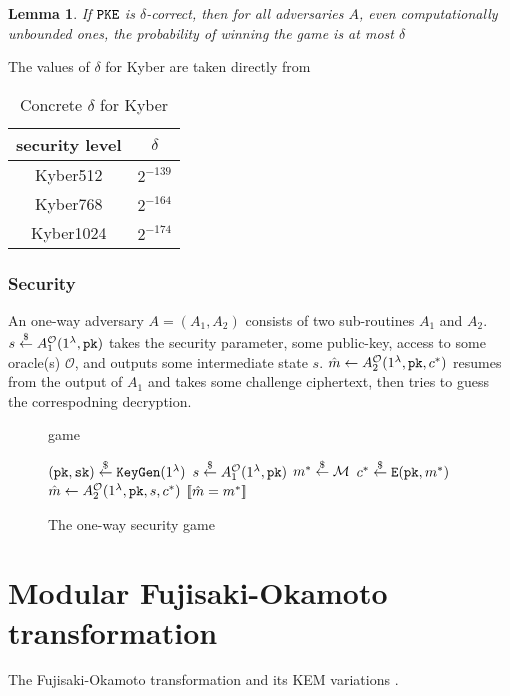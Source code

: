 \documentclass{article}
\newtheorem{lemma}{Lemma}[theorem]
\begin{document}
\begin{lemma}
    If $\texttt{PKE}$ is $\delta$-correct, then for all  adversaries $A$, even computationally unbounded ones, the probability of winning the  game is at most $\delta$
\end{lemma}

The values of $\delta$ for Kyber are taken directly from \cite{avanzi2019crystals}

\begin{table}[H]
    \center
    \begin{tabular}{c|c}
        security level & $\delta$ \\
        \hline
        Kyber512 & $2^{-139}$ \\
        \hline
        Kyber768 & $2^{-164}$ \\
        \hline
        Kyber1024 & $2^{-174}$ \\
    \end{tabular}
    \caption{Concrete $\delta$ for Kyber}\label{tbl:kyber-delta-vals}
\end{table}

\subsubsection{Security}
An one-way adversary $A = (A_1, A_2)$ consists of two sub-routines $A_1$ and $A_2$. $s \stackrel{\$}{\leftarrow} A_1^{\mathcal{O}}(1^\lambda, \texttt{pk})$ takes the security parameter, some public-key, access to some oracle(s) $\mathcal{O}$, and outputs some intermediate state $s$. $\hat{m} \leftarrow A_2^\mathcal{O}(1^\lambda, \texttt{pk}, c^\ast)$ resumes from the output of $A_1$ and takes some challenge ciphertext, then tries to guess the correspodning decryption.

\begin{figure}[H]
    \begin{algorithm}[H]
        \caption{ game}\label{alg:ow-atk-game}
        \begin{algorithmic}[1]
            \State $(\texttt{pk}, \texttt{sk}) \stackrel{\$}{\leftarrow} \texttt{KeyGen}(1^\lambda)$
            \State $s \stackrel{\$}{\leftarrow} A_1^\mathcal{O}(1^\lambda, \texttt{pk})$
            \State $m^\ast \stackrel{\$}{\leftarrow} \mathcal{M}$
            \State $c^\ast \stackrel{\$}{\leftarrow} \texttt{E}(\texttt{pk}, m^\ast)$
            \State $\hat{m} \leftarrow A_2^\mathcal{O}(1^\lambda, \texttt{pk}, s, c^\ast)$
            \State \Return $[\![ \hat{m} = m^\ast]\!]$
        \end{algorithmic}
    \end{algorithm}
    \caption{The one-way security game}\label{fig:ow-atk-game}
\end{figure}

\section{Modular Fujisaki-Okamoto transformation}
The Fujisaki-Okamoto transformation \cite{fujisaki1999secure} and its KEM variations \cite{hofheinz2017modular}.



\end{document}
